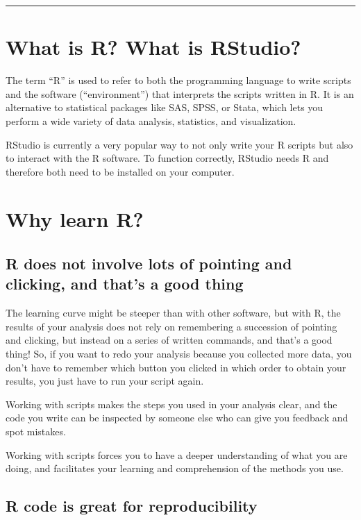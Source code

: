 \documentclass[]{book}
\theoremstyle{definition}
\theoremstyle{definition}
\theoremstyle{remark}
\begin{document}
\begin{center}\rule{0.5\linewidth}{\linethickness}\end{center}

\section{What is R? What is RStudio?}\label{what-is-r-what-is-rstudio}

The term ``R'' is used to refer to both the programming language to
write scripts and the software (``environment'') that interprets the
scripts written in R. It is an alternative to statistical packages like
SAS, SPSS, or Stata, which lets you perform a wide variety of data
analysis, statistics, and visualization.

RStudio is currently a very popular way to not only write your R scripts
but also to interact with the R software. To function correctly, RStudio
needs R and therefore both need to be installed on your computer.

\section{Why learn R?}\label{why-learn-r}

\subsection{R does not involve lots of pointing and clicking, and that's
a good
thing}\label{r-does-not-involve-lots-of-pointing-and-clicking-and-thats-a-good-thing}

The learning curve might be steeper than with other software, but with
R, the results of your analysis does not rely on remembering a
succession of pointing and clicking, but instead on a series of written
commands, and that's a good thing! So, if you want to redo your analysis
because you collected more data, you don't have to remember which button
you clicked in which order to obtain your results, you just have to run
your script again.

Working with scripts makes the steps you used in your analysis clear,
and the code you write can be inspected by someone else who can give you
feedback and spot mistakes.

Working with scripts forces you to have a deeper understanding of what
you are doing, and facilitates your learning and comprehension of the
methods you use.

\subsection{R code is great for
reproducibility}\label{r-code-is-great-for-reproducibility}
\end{document}
